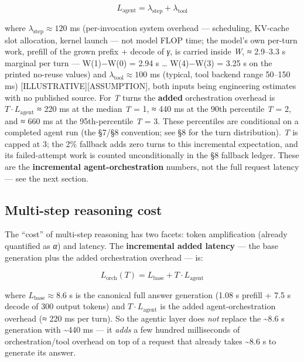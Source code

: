 \[
L_\text{agent} = \lambda_\text{step} + \lambda_\text{tool}
\]

where \(\lambda_\text{step} \approx 120\) ms (per-invocation system
overhead --- scheduling, KV-cache slot allocation, kernel launch --- not
model FLOP time; the model's own per-turn work, prefill of the grown
prefix + decode of \emph{γ}, is carried inside \emph{W}, ≈ 2.9--3.3 s
marginal per turn --- W(1)−W(0) = 2.94 s \ldots{} W(4)−W(3) = 3.25 s on
the printed no-reuse values) and \(\lambda_\text{tool} \approx 100\) ms
(typical, tool backend range 50--150 ms)
\mbox{{[}ILLUSTRATIVE{]}}\hspace{0pt}\mbox{{[}ASSUMPTION{]}}, both inputs being engineering
estimates with no published source. For \emph{T} turns the
\textbf{added} orchestration overhead is \(T\cdot L_\text{agent}\) ≈ 220
ms at the median \emph{T} = 1, ≈ 440 ms at the 90th percentile \emph{T}
= 2, and ≈ 660 ms at the 95th-percentile \emph{T} = 3. These percentiles
are conditional on a completed agent run (the §7/§8 convention; see §8
for the turn distribution). \emph{T} is capped at 3; the 2\% fallback
adds zero turns to this incremental expectation, and its failed-attempt
work is counted unconditionally in the §8 fallback ledger. These are the
\textbf{incremental agent-orchestration} numbers, not the full request
latency --- see the next section.

\subsection{Multi-step reasoning cost}\label{multi-step-reasoning-cost}

The ``cost'' of multi-step reasoning has two facets: token amplification
(already quantified as \emph{α}) and latency. The \textbf{incremental
added latency} --- the base generation plus the added orchestration
overhead --- is:

\[
L_\text{orch}(T) = L_\text{base} + T \cdot L_\text{agent}
\]

where \(L_\text{base} \approx 8.6\) s is the canonical full answer
generation (1.08 s prefill + 7.5 s decode of 300 output tokens) and
\(T \cdot L_\text{agent}\) is the added agent-orchestration overhead (≈
220 ms per turn). So the agentic layer does \emph{not} replace the
\textasciitilde8.6 s generation with \textasciitilde440 ms --- it
\emph{adds} a few hundred milliseconds of orchestration/tool overhead on
top of a request that already takes \textasciitilde8.6 s to generate its
answer.

